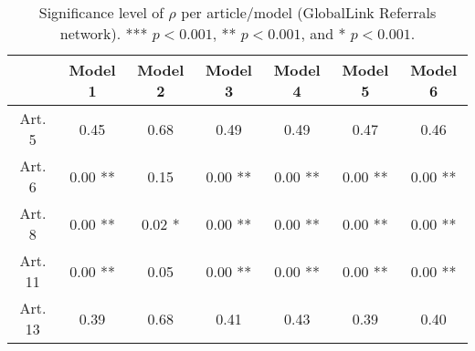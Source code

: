 \begin{table}[ht]
\centering
\begin{tabular}{ccccccc}
  \toprule
 & Model 1 & Model 2 & Model 3 & Model 4 & Model 5 & Model 6 \\ 
  \midrule
Art. 5 & 0.45   & 0.68   & 0.49   & 0.49   & 0.47   & 0.46   \\ 
   \midrule
Art. 6 & 0.00 ** & 0.15   & 0.00 ** & 0.00 ** & 0.00 ** & 0.00 ** \\ 
   \midrule
Art. 8 & 0.00 ** & 0.02 * & 0.00 ** & 0.00 ** & 0.00 ** & 0.00 ** \\ 
   \midrule
Art. 11 & 0.00 ** & 0.05   & 0.00 ** & 0.00 ** & 0.00 ** & 0.00 ** \\ 
   \midrule
Art. 13 & 0.39   & 0.68   & 0.41   & 0.43   & 0.39   & 0.40   \\ 
   \bottomrule
\end{tabular}
\caption{Significance level of $\rho$ per article/model (GlobalLink Referrals network). *** $p < 0.001$, ** $p < 0.001$, and * $p < 0.001$.} 
\end{table}
